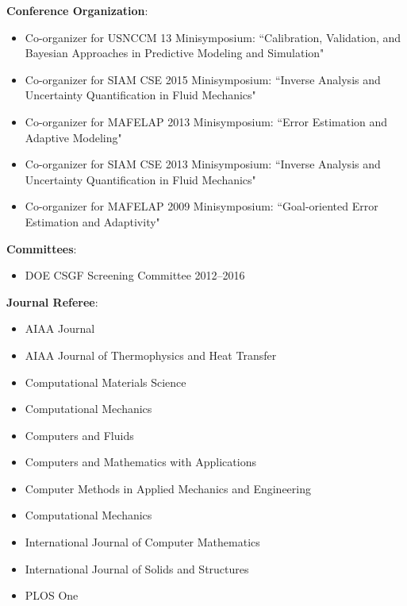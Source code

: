 \textbf{Conference Organization}:
\begin{itemize}
\itemsep 0pt
\item Co-organizer for USNCCM 13 Minisymposium: ``Calibration, Validation, and Bayesian Approaches in Predictive
Modeling and Simulation"
\item Co-organizer for SIAM CSE 2015 Minisymposium: ``Inverse Analysis and Uncertainty Quantification in Fluid Mechanics"
\item Co-organizer for MAFELAP 2013 Minisymposium: ``Error Estimation and Adaptive Modeling"
\item Co-organizer for SIAM CSE 2013 Minisymposium: ``Inverse Analysis and Uncertainty Quantification in Fluid Mechanics"
\item Co-organizer for MAFELAP 2009 Minisymposium: ``Goal-oriented Error Estimation and Adaptivity"
\end{itemize}

\blankline

\textbf{Committees}:
\begin{itemize}
\itemsep 0pt
\item DOE CSGF Screening Committee 2012--2016
\end{itemize}

\blankline


\textbf{Journal Referee}:
\begin{itemize}
\itemsep 0pt
\item AIAA Journal
\item AIAA Journal of Thermophysics and Heat Transfer
\item Computational Materials Science
\item Computational Mechanics
\item Computers and Fluids
\item Computers and Mathematics with Applications
\item Computer Methods in Applied Mechanics and Engineering
\item Computational Mechanics
\item International Journal of Computer Mathematics
\item International Journal of Solids and Structures
\item PLOS One
\end{itemize}

